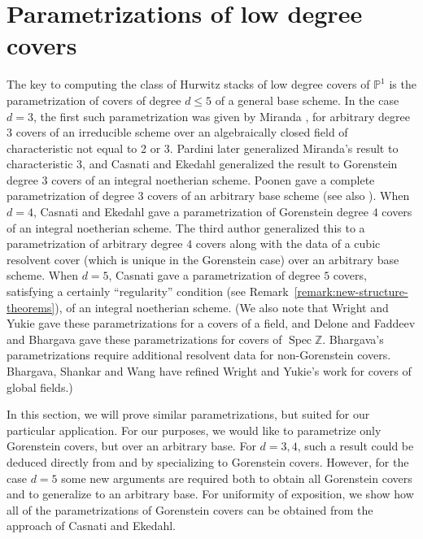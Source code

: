 \documentclass[12 pt]{amsart}
\theoremstyle{plain}
\theoremstyle{definition}
\theoremstyle{remark}
\numberwithin{equation}{section}
\newcommand\bp{\mathbb P}
\newcommand{\Z}{\mathbb Z}
\newcommand{\Spec}{\operatorname{Spec}}
\begin{document}
\section{Parametrizations of low degree covers} \label{section:generalizing-ce}

The key to computing the class of Hurwitz stacks of low degree covers of $\bp^1$
is the parametrization of covers of degree $d \leq 5$ of a general base scheme.  
In the case $d=3$, the first such parametrization was given by Miranda \cite[Thm.\ 1.1]{miranda:triple-covers-in-algebraic-geometry}, for arbitrary degree 3 covers of an
 irreducible scheme over an algebraically closed field of characteristic not equal to 2 or 3.
 Pardini \cite{Pardini1989} later generalized Miranda's result to characteristic 3,
 and Casnati and Ekedahl \cite[Thm.\ 3.4]{casnatiE:covers-algebraic-varieties} generalized the result
 to Gorenstein degree 3 covers of an integral noetherian scheme.  Poonen \cite[Prop.\ 5.1]{Poonen2008}  gave a complete parametrization of degree $3$ covers of an arbitrary base scheme
 (see also \cite[Thm. 2.1]{Wood2011}).  When $d=4$, Casnati and Ekedahl
 \cite[Thm.\ 4.4]{casnatiE:covers-algebraic-varieties} gave a parametrization of 
 Gorenstein degree $4$ covers of an integral noetherian scheme.  The third author \cite[Thm.\ 1.1]{Wood2011}
generalized this to a parametrization of arbitrary degree $4$ covers along with the data
of a cubic resolvent cover (which is unique in the Gorenstein case) over an arbitrary base scheme.
When $d=5$, Casnati \cite[Theorem 3.8]{casnati:covers-algebraic-varieties-ii}
gave a parametrization of 
   degree $5$ covers, satisfying a certainly ``regularity'' condition (see Remark~\ref{remark:new-structure-theorems}), of an integral noetherian scheme.
(We also note that
Wright and Yukie \cite{Wright1992} gave
these parametrizations for a covers of a field, 
and Delone and Faddeev \cite{Delone1964}
and Bhargava \cite{Bhargava2004b, Bhargava2008a}  gave these parametrizations for covers of $\Spec \Z$.  Bhargava's parametrizations
require additional resolvent data for non-Gorenstein covers.
Bhargava, Shankar and Wang \cite[Section 3]{bhargavaSW:geometry-of-numbers-over-global-fields-i} have refined Wright and Yukie's work for covers of global fields.)


In this section, we will prove similar parametrizations, but suited for our particular application.
For our purposes, we would like to parametrize only Gorenstein covers, but over an arbitrary base.
For $d=3,4$, such a result could be deduced directly from \cite[Prop.\ 5.1]{Poonen2008} and \cite[Thm.\ 1.1]{Wood2011} by specializing to Gorenstein covers. However, for the case $d=5$ some new arguments are required both to obtain all Gorenstein covers and to generalize to an arbitrary base.  
For uniformity of exposition, we show how all of the parametrizations of Gorenstein covers can be 
obtained from the approach of Casnati and Ekedahl.
\end{document}
